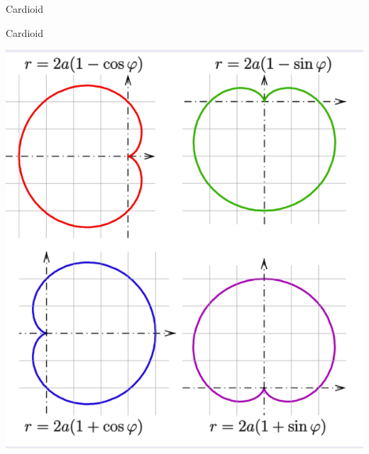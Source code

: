 \begin{frame}{Cardioid}
    \begin{block}{Cardioid}
        \begin{center}
            \includegraphics[width=0.5\linewidth]{res/Cardioid.png}
        \end{center}
    \end{block}
\end{frame}

